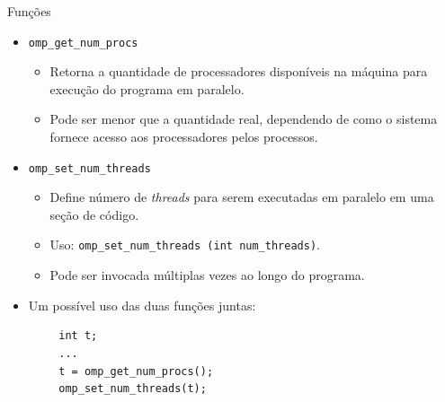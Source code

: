 \begin{frame}[fragile]{Funções}
	\begin{itemize}
		\item \texttt{omp\_get\_num\_procs}
		\medskip
		\begin{itemize}
			\item Retorna a quantidade de processadores disponíveis na máquina para execução do programa em paralelo.
			\smallskip
			\item Pode ser menor que a quantidade real, dependendo de como o sistema fornece acesso aos processadores pelos processos.
		\end{itemize}
		\medskip
		\item \texttt{omp\_set\_num\_threads}
		\begin{itemize}
			\item Define número de \textit{threads} para serem executadas em paralelo em uma seção de código.
			\smallskip
			\item Uso: \texttt{omp\_set\_num\_threads (int num\_threads)}.
			\smallskip
			\item Pode ser invocada múltiplas vezes ao longo do programa.
		\end{itemize}
		\medskip
		\item Um possível uso das duas funções juntas:
	\end{itemize}
	\begin{verbatim}
		int t;
		...
		t = omp_get_num_procs();
		omp_set_num_threads(t);
	\end{verbatim}
\end{frame}

